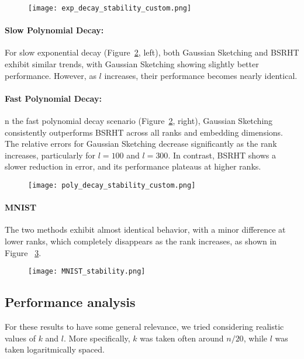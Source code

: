 \documentclass[a4paper, 12pt,oneside]{article}
\begin{document}
\begin{figure}[H]
\centering
\texttt{[image: exp\_decay\_stability\_custom.png]}
\caption{}
\label{fig:slow_fast_exp_decay}
\end{figure}

\paragraph{Slow Polynomial Decay:} 
For slow exponential decay (Figure~\ref{fig:poly_decay}, left), both Gaussian Sketching and BSRHT exhibit similar trends, with Gaussian Sketching showing slightly better performance. However, as \( l \) increases, their performance becomes nearly identical.

\paragraph{Fast Polynomial Decay:} 
n the fast polynomial decay scenario (Figure~\ref{fig:poly_decay}, right), Gaussian Sketching consistently outperforms BSRHT across all ranks and embedding dimensions. The relative errors for Gaussian Sketching decrease significantly as the rank increases, particularly for $l = 100$ and $l = 300$. In contrast, BSRHT shows a slower reduction in error, and its performance plateaus at higher ranks.
\begin{figure}[H]
\centering
\texttt{[image: poly\_decay\_stability\_custom.png]}
\caption{}
\label{fig:poly_decay}
\end{figure}
\paragraph{MNIST}
The two methods exhibit almost identical behavior, with a minor difference at lower ranks, which completely disappears as the rank increases, as shown in Figure ~\ref{fig:mnsit_decay}.
\begin{figure}[H]
\centering
\texttt{[image: MNIST\_stability.png]}
\caption{}
\label{fig:mnsit_decay}
\end{figure}
	\subsection{Performance analysis}
		For these results to have some general relevance, we tried considering realistic values of $k$ and $l$. More specifically, $k$ was taken often around $n/20$, while $l$ was taken logaritmically spaced.
	
\end{document}
